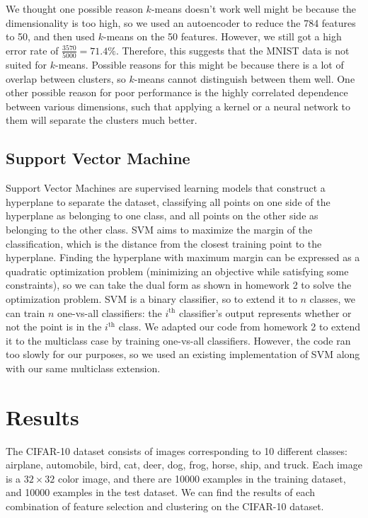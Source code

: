 \documentclass[11pt]{article}
\begin{document}
We thought one possible reason $k$-means doesn't work well might be because the dimensionality is too high, so we used an autoencoder to reduce the 784 features to 50, and then used $k$-means on the 50 features. However, we still got a high error rate of $\frac{3570}{5000} = 71.4\%$. Therefore, this suggests that the MNIST data is not suited for $k$-means. Possible reasons for this might be because there is a lot of overlap between clusters, so $k$-means cannot distinguish between them well. One other possible reason for poor performance is the highly correlated dependence between various dimensions, such that applying a kernel or a neural network to them will separate the clusters much better.

\subsection{Support Vector Machine}
Support Vector Machines are supervised learning models that construct a hyperplane to separate the dataset, classifying all points on one side of the hyperplane as belonging to one class, and all points on the other side as belonging to the other class. SVM aims to maximize the margin of the classification, which is the distance from the closest training point to the hyperplane. Finding the hyperplane with maximum margin can be expressed as a quadratic optimization problem (minimizing an objective while satisfying some constraints), so we can take the dual form as shown in homework 2 to solve the optimization problem. SVM is a binary classifier, so to extend it to $n$ classes, we can train $n$ one-vs-all classifiers: the $i^{\text{th}}$ classifier's output represents whether or not the point is in the $i^{\text{th}}$ class. We adapted our code from homework 2 to extend it to the multiclass case by training one-vs-all classifiers. However, the code ran too slowly for our purposes, so we used an existing implementation of SVM along with our same multiclass extension.

\section{Results}
The CIFAR-10 dataset consists of images corresponding to 10 different classes: airplane, automobile, bird, cat, deer, dog, frog, horse, ship, and truck. Each image is a $32 \times 32$ color image, and there are 10000 examples in the training dataset, and 10000 examples in the test dataset. We can find the results of each combination of feature selection and clustering on the CIFAR-10 dataset.
\end{document}
